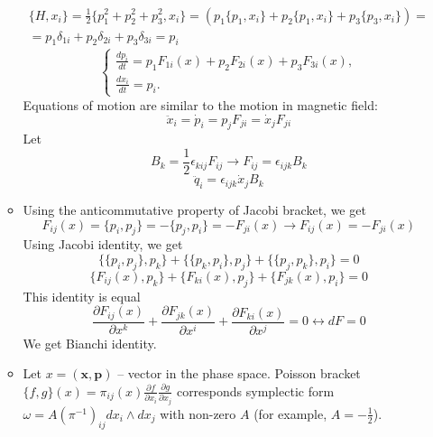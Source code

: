 \documentclass[12pt]{article}
\theoremstyle{definition}
\begin{document}
\begin{enumerate}
\begin{itemize}
\begin{align}
        \end{align}
        \begin{align}
            \{H,x_i\}=\frac{1}{2}\{p_1^2+p_2^2+p_3^2,x_i\}=(p_1\{p_1,x_i\}+p_2\{p_1,x_i\}+p_3\{p_3,x_i\})=\\=p_1\delta_{1i}+p_2\delta_{2i}+p_3\delta_{3i}=p_i
        \end{align}
        \begin{equation}
            \boxed{\begin{cases}
            \frac{dp_i}{dt}=p_1F_{1i}(x)+p_2F_{2i}(x)+p_3F_{3i}(x),\\
            \frac{dx_i}{dt}=p_i.
            \end{cases}}
        \end{equation}
        Equations of motion are similar to the motion in magnetic field:
        \begin{equation}
            \ddot{x}_i=\dot{p}_i=p_j F_{ji}=\dot{x}_jF_{ji}
        \end{equation}
        Let
        \begin{equation}
            B_k=\frac{1}{2}\epsilon_{kij}F_{ij}\rightarrow F_{ij}=\epsilon_{ijk}B_k
        \end{equation}
        \begin{equation}
            \ddot{q}_i=\epsilon_{ijk}\dot{x}_jB_k
        \end{equation}
    \item Using the anticommutative property of Jacobi bracket, we get
    \begin{equation}
        F_{ij}(x)=\{p_i,p_j\}=-\{p_j,p_i\}=-F_{ji}(x)\rightarrow\boxed{F_{ij}(x)=-F_{ji}(x)}
    \end{equation}
    Using Jacobi identity, we get
    \begin{equation}
        \{\{p_i,p_j\},p_k\}+\{\{p_k,p_i\},p_j\}+\{\{p_j,p_k\},p_i\}=0
    \end{equation}
    \begin{equation}
        \{F_{ij}(x),p_k\}+\{F_{ki}(x),p_j\}+\{F_{jk}(x),p_i\}=0
    \end{equation}
    This identity is equal
    \begin{equation}
        \boxed{\frac{\partial F_{ij}(x)}{\partial x^k}+\frac{\partial F_{jk}(x)}{\partial x^i}+\frac{\partial F_{ki}(x)}{\partial x^j}=0\leftrightarrow dF=0}
    \end{equation}
    We get Bianchi identity.
    \item Let $x=(\bm{x},\bm{p})$ -- vector in the phase space. Poisson bracket $\{f,g\}(x)=\pi_{ij}(x)\frac{\partial f}{\partial x_i}\frac{\partial g}{\partial x_j}$ corresponds symplectic form $\omega=A(\pi^{-1})_{ij}dx_i\wedge dx_j$ with non-zero $A$ (for example, $A=-\frac{1}{2}$).

\end{itemize}
\end{enumerate}
\end{document}
